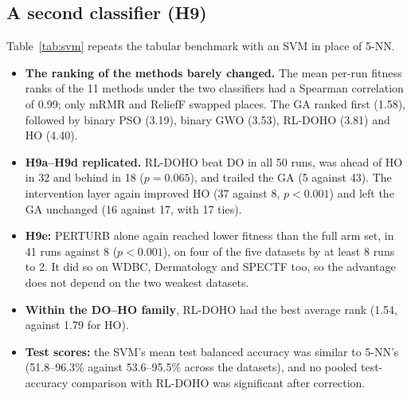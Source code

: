 \documentclass[journal]{IEEEtran}
\begin{document}
\subsection{A second classifier (H9)}\label{sec:svm}
Table~\ref{tab:svm} repeats the tabular benchmark with an SVM in place of 5-NN.
\begin{itemize}
\item \textbf{The ranking of the methods barely changed.} The mean per-run fitness ranks of the 11 methods under the two classifiers had a Spearman correlation of 0.99; only mRMR and ReliefF swapped places. The GA ranked first (1.58), followed by binary PSO (3.19), binary GWO (3.53), RL-DOHO (3.81) and HO (4.40).
\item \textbf{H9a--H9d replicated.} RL-DOHO beat DO in all 50 runs, was ahead of HO in 32 and behind in 18 ($p=0.065$), and trailed the GA (5 against 43). The intervention layer again improved HO (37 against 8, $p<0.001$) and left the GA unchanged (16 against 17, with 17 ties).
\item \textbf{H9e:} PERTURB alone again reached lower fitness than the full arm set, in 41 runs against 8 ($p<0.001$), on four of the five datasets by at least 8 runs to 2. It did so on WDBC, Dermatology and SPECTF too, so the advantage does not depend on the two weakest datasets.
\item \textbf{Within the DO--HO family}, RL-DOHO had the best average rank (1.54, against 1.79 for HO).
\item \textbf{Test scores:} the SVM's mean test balanced accuracy was similar to 5-NN's (51.8--96.3\% against 53.6--95.5\% across the datasets), and no pooled test-accuracy comparison with RL-DOHO was significant after correction.
\end{itemize}
\end{document}
